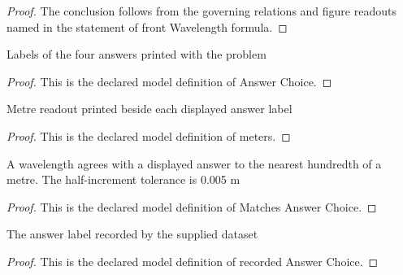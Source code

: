 \begin{proof}
  The conclusion follows from the governing relations and figure readouts named in the statement of front Wavelength formula.
\end{proof}
\begin{definition}
  \label{def:physics:phyx-mini-0193:phyxminiproblems-problemphyxmini0193-answerchoice}
  Labels of the four answers printed with the problem
\end{definition}
\begin{proof}
  This is the declared model definition of Answer Choice.
\end{proof}
\begin{definition}[meters]
  \label{def:physics:phyx-mini-0193:phyxminiproblems-problemphyxmini0193-answerchoice-meters}
  Metre readout printed beside each displayed answer label
\end{definition}
\begin{proof}
  This is the declared model definition of meters.
\end{proof}
\begin{definition}
  \label{def:physics:phyx-mini-0193:phyxminiproblems-problemphyxmini0193-matchesanswerchoice}
  A wavelength agrees with a displayed answer to the nearest hundredth of a metre. The half-increment tolerance is 0.005 m
\end{definition}
\begin{proof}
  This is the declared model definition of Matches Answer Choice.
\end{proof}
\begin{definition}
  \label{def:physics:phyx-mini-0193:phyxminiproblems-problemphyxmini0193-recordedanswerchoice}
  The answer label recorded by the supplied dataset
\end{definition}
\begin{proof}
  This is the declared model definition of recorded Answer Choice.
\end{proof}
